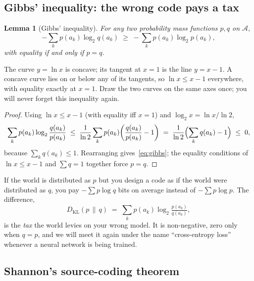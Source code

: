\documentclass[12pt,a4paper]{article}
\theoremstyle{plain}
\newtheorem{lemma}[theorem]{Lemma}
\theoremstyle{definition}
\begin{document}
\subsection*{Gibbs' inequality: the wrong code pays a tax}

\begin{lemma}[Gibbs' inequality]
\label{lem:gibbs}
For any two probability mass functions $p, q$ on $\mathcal{A}$,
\begin{equation}
  -\sum_{k} p(a_k) \log_2 q(a_k)
    \;\ge\; -\sum_{k} p(a_k) \log_2 p(a_k),
  \label{eq:gibbs}
\end{equation}
with equality if and only if $p = q$.
\end{lemma}

\begin{aside}[title={A one-picture reason to believe $\ln x \le x - 1$}]
The curve $y = \ln x$ is concave; its tangent at $x = 1$ is the line
$y = x - 1$. A concave curve lies on or below any of its tangents,
so $\ln x \le x - 1$ everywhere, with equality exactly at $x = 1$.
Draw the two curves on the same axes once; you will never forget
this inequality again.
\end{aside}

\begin{proof}
Using $\ln x \le x - 1$ (with equality iff $x = 1$) and
$\log_2 x = \ln x / \ln 2$,
\[
  \sum_k p(a_k) \log_2 \frac{q(a_k)}{p(a_k)}
  \;\le\; \frac{1}{\ln 2}\sum_k p(a_k)\!\left(\frac{q(a_k)}{p(a_k)} - 1\right)
  \;=\; \frac{1}{\ln 2}\Bigl(\sum_k q(a_k) - 1\Bigr) \;\le\; 0,
\]
because $\sum_k q(a_k) \le 1$. Rearranging gives~\eqref{eq:gibbs};
the equality conditions of $\ln x \le x - 1$ and $\sum q = 1$
together force $p = q$.
\end{proof}

\begin{intuition}[title={What Gibbs really says}]
If the world is distributed as $p$ but you design a code as if the
world were distributed as $q$, you pay $-\sum p\log q$ bits on
average instead of $-\sum p\log p$. The difference,
\[
  D_{\mathrm{KL}}(p \,\|\, q)
    \;=\; \sum_k p(a_k) \log_2 \tfrac{p(a_k)}{q(a_k)},
\]
is the \emph{tax} the world levies on your wrong model. It is
non-negative, zero only when $q=p$, and we will meet it again under
the name ``cross-entropy loss'' whenever a neural network is being
trained.
\end{intuition}

\subsection*{Shannon's source-coding theorem}
\end{document}

